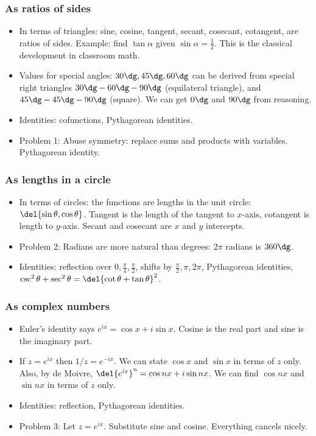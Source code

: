 \documentclass[10pt,paper=letter]{scrartcl}
\begin{document}
\subsubsection*{As ratios of sides}

\begin{itemize}
  \item In terms of triangles: sine, cosine, tangent, secant, cosecant, cotangent, are ratios of sides. Example: find $\tan \alpha$ given $\sin \alpha = \frac12$. This is the classical development in classroom math.
  \item Values for special angles: $30\dg, 45\dg, 60\dg$ can be derived from special right triangles $30\dg-60\dg-90\dg$ (equilateral triangle), and $45\dg-45\dg-90\dg$ (square). We can get $0\dg$ and $90\dg$ from reasoning.
  \item Identities: cofunctions, Pythagorean identities.
  \item Problem 1: Abuse symmetry: replace sums and products with variables. Pythagorean identity.
\end{itemize}

\subsubsection*{As lengths in a circle}

\begin{itemize}
  \item In terms of circles: the functions are lengths in the unit circle: $\del{\sin\theta, \cos\theta}$. Tangent is the length of the tangent to $x$-axis, cotangent is length to $y$-axis. Secant and cosecant are $x$ and $y$ intercepts.
  \item Problem 2: Radians are more natural than degrees: $2\pi$ radians is $360\dg$.
  \item Identities: reflection over $0, \frac\pi4, \frac\pi2$, shifts by $\frac\pi2, \pi, 2\pi$, Pythagorean identities, $\csc^2\theta + \sec^2\theta = \del{\cot\theta + \tan\theta}^2$.
\end{itemize}

\subsubsection*{As complex numbers}

\begin{itemize}
  \item Euler's identity says $e^{ix} = \cos x + i \sin x$. Cosine is the real part and sine is the imaginary part.
  \item If $z = e^{ix}$ then $1/z = e^{-ix}$. We can state $\cos x$ and $\sin x$ in terms of $z$ only. Also, by de Moivre, $\del{e^{ix}}^n = \cos nx + i \sin nx$. We can find $\cos nx$ and $\sin nx$ in terms of $z$ only.
  \item Identities: reflection, Pythagorean identities.
  \item Problem 3: Let $z = e^{ix}$. Substitute sine and cosine. Everything cancels nicely.
\end{itemize}
\end{document}
